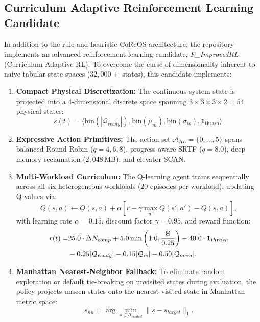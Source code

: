 \documentclass[conference]{IEEEtran}
\begin{document}
\subsection{Curriculum Adaptive Reinforcement Learning Candidate}
In addition to the rule-and-heuristic CoReOS architecture, the repository implements an advanced reinforcement learning candidate, \textit{F\_ImprovedRL} (Curriculum Adaptive RL). To overcome the curse of dimensionality inherent to naive tabular state spaces ($32,000+$ states), this candidate implements:
\begin{enumerate}
    \item \textbf{Compact Physical Discretization:} The continuous system state is projected into a 4-dimensional discrete space spanning $3 \times 3 \times 3 \times 2 = 54$ physical states:
    \begin{equation}
        s(t) = \langle \text{bin}(|\mathcal{Q}_{ready}|), \text{bin}(\mu_m), \text{bin}(\sigma_{io}), \mathbf{1}_{\text{thrash}} \rangle.
    \end{equation}
    \item \textbf{Expressive Action Primitives:} The action set $\mathcal{A}_{RL} = \{0, \dots, 5\}$ spans balanced Round Robin ($q=4, 6, 8$), progress-aware SRTF ($q=8.0$), deep memory reclamation ($2,048$\,MB), and elevator SCAN.
    \item \textbf{Multi-Workload Curriculum:} The Q-learning agent trains sequentially across all six heterogeneous workloads ($20$ episodes per workload), updating Q-values via:
    \begin{equation}
        Q(s, a) \leftarrow Q(s, a) + \alpha \left[ r + \gamma \max_{a'} Q(s', a') - Q(s, a) \right],
    \end{equation}
    with learning rate $\alpha = 0.15$, discount factor $\gamma = 0.95$, and reward function:
    \begin{align}
        r(t) = & 25.0 \cdot \Delta N_{comp} + 5.0 \min\left(1.0, \frac{\Theta}{0.25}\right) - 40.0 \cdot \mathbf{1}_{thrash} \notag \\
        & - 0.25 |\mathcal{Q}_{ready}| - 0.15 |\mathcal{Q}_{io}| - 0.50 |\mathcal{Q}_{mem}|.
    \end{align}
    \item \textbf{Manhattan Nearest-Neighbor Fallback:} To eliminate random exploration or default tie-breaking on unvisited states during evaluation, the policy projects unseen states onto the nearest visited state in Manhattan metric space:
    \begin{equation}
        s_{nn} = \arg\min_{s \in \mathcal{S}_{visited}} \| s - s_{target} \|_1.
    \end{equation}
\end{enumerate}
\end{document}
